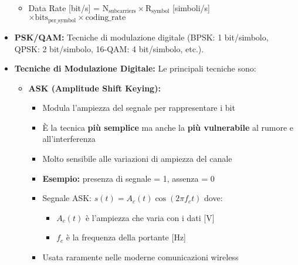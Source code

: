 \begin{itemize}
    \begin{itemize}
        \item Data Rate [\si{bit/s}] = $\text{N}_{\text{subcarriers}} \times \text{R}_{\text{symbol}}$ [\si{simboli/s}] $\times \text{bits}_{\text{per\_symbol}} \times \text{coding\_rate}$
    \end{itemize}
    \item \textbf{PSK/QAM:} Tecniche di modulazione digitale (BPSK: 1 bit/simbolo, QPSK: 2 bit/simbolo, 16-QAM: 4 bit/simbolo, etc.).
    \item \textbf{Tecniche di Modulazione Digitale:} Le principali tecniche sono:
    \begin{itemize}
        \item \textbf{ASK (Amplitude Shift Keying):}
            \begin{itemize}
                \item Modula l'ampiezza del segnale per rappresentare i bit
                \item È la tecnica \textbf{più semplice} ma anche la \textbf{più vulnerabile} al rumore e all'interferenza
                \item Molto sensibile alle variazioni di ampiezza del canale
                \item \textbf{Esempio:} presenza di segnale = 1, assenza = 0
                \item Segnale ASK: $s(t) = A_c(t) \cos(2\pi f_c t)$ dove:
                    \begin{itemize}
                        \item $A_c(t)$ è l'ampiezza che varia con i dati [\si{V}]
                        \item $f_c$ è la frequenza della portante [\si{Hz}]
                    \end{itemize}
                \item Usata raramente nelle moderne comunicazioni wireless
            \end{itemize}
        

\end{itemize}
\end{itemize}
